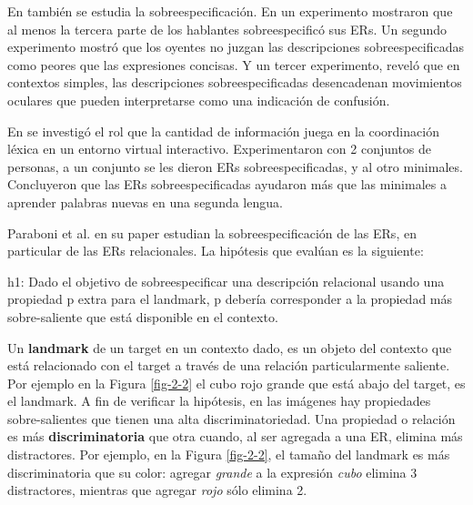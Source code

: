 En \cite{Engelhardt_Bailey_Ferreira_2006} tambi\'en se estudia la sobreespecificaci\'on. En un experimento mostraron que al menos la tercera parte de los hablantes sobreespecific\'o sus ERs. Un segundo experimento mostr\'o que los oyentes no juzgan las descripciones sobreespecificadas como peores que las expresiones concisas. Y un tercer experimento, revel\'o que en contextos simples, las descripciones sobreespecificadas desencadenan movimientos oculares que pueden interpretarse como una indicaci\'on de confusi\'on. 


En \cite{Lu_sasha2015} se investig\'o el rol que la cantidad de informaci\'on juega en la coordinaci\'on l\'exica en un entorno virtual interactivo. Experimentaron con 2 conjuntos de personas, a un conjunto se les dieron ERs sobreespecificadas, y al otro minimales. Concluyeron que las ERs sobreespecificadas ayudaron m\'as que las minimales a aprender palabras nuevas en una segunda lengua.


Paraboni et al. en su paper \cite{acl-Paraboni15} estudian la sobreespecificaci\'on de las ERs, en particular de las ERs relacionales.
La hip\'otesis que eval\'uan es la siguiente:
\begin{it}
\begin{displayquote}h1: Dado el objetivo de sobreespecificar una descripci\'on relacional usando una propiedad p extra para el landmark, p deber\'ia corresponder a la propiedad m\'as sobre-saliente que est\'a disponible en el contexto. %
\end{displayquote}
\end{it}

Un \textbf{landmark} de un target en un contexto dado, es un objeto del contexto que est\'a relacionado con el target a trav\'es de una relaci\'on particularmente saliente. Por ejemplo en la Figura \ref{fig-2-2} el cubo rojo grande que est\'a abajo del target, es el landmark.
A fin de verificar la hip\'otesis, en las im\'agenes hay propiedades sobre-salientes que tienen una alta discriminatoriedad. Una propiedad o relaci\'on es m\'as \textbf{discriminatoria} que otra cuando, al ser agregada a una ER, elimina m\'as distractores. Por ejemplo, en la Figura \ref{fig-2-2}, el tama\~no del landmark es m\'as discriminatoria que su color: agregar \emph{grande} a la expresi\'on \emph{cubo} elimina 3 distractores, mientras que agregar \emph{rojo} s\'olo elimina 2.

